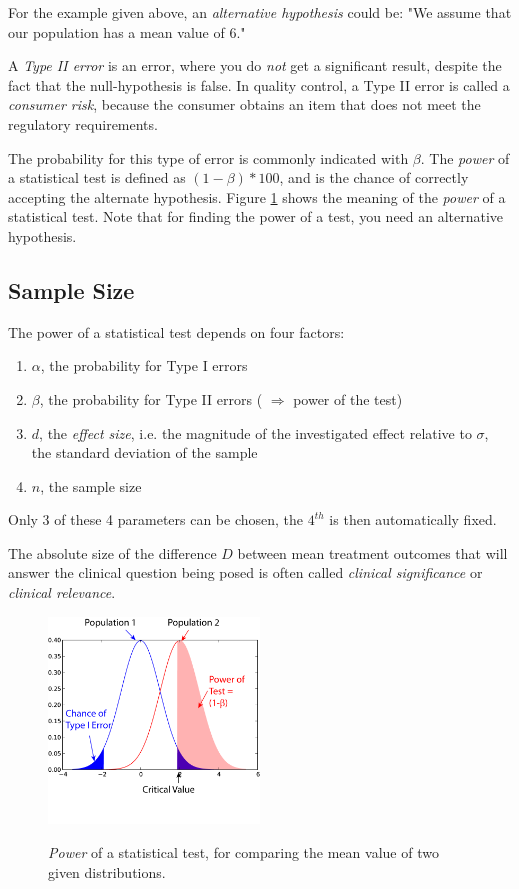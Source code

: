 For the example given above, an \emph{alternative hypothesis} could be: "We assume that our population has a mean value of 6."

A \emph{Type II error} is an error, where you do \emph{not} get a significant result, despite the fact that the null-hypothesis is false.  In quality control, a Type II error is called a \emph{consumer risk}, because the consumer obtains an item that does not meet the regulatory requirements.

The probability for this type of error is commonly indicated with $\beta$. The \emph{power} of a statistical test is defined as $(1-\beta)*100$, and is the chance of correctly accepting the alternate hypothesis. Figure \ref{fig:power1} shows the meaning of the \emph{power} of a statistical test. Note that for finding the power of a test, you need an alternative hypothesis.

\subsection{Sample Size}
The power of a statistical test depends on four factors:

\begin{enumerate}
  \item  $\alpha$, the probability for Type I errors
  \item  $\beta$, the probability for Type II errors ( $\Rightarrow$ power of the test)
  \item  $d$, the \emph{effect size}, i.e. the magnitude of the investigated effect relative to $\sigma$, the standard deviation of the sample
  \item  $n$, the sample size
\end{enumerate}

Only 3 of these 4 parameters can be chosen, the $4^{th}$ is then automatically fixed.

The absolute size of the difference $D$ between mean treatment outcomes that will answer the clinical question being posed is often called \emph{clinical significance} or \emph{clinical relevance}.

\begin{figure}[!ht]
  \centering
  \includegraphics[width=0.5\textwidth]{../Images/power1.png}\\
  \caption{\emph{Power} of a statistical test, for comparing the mean value of two given distributions.}\label{fig:power1}
\end{figure}

